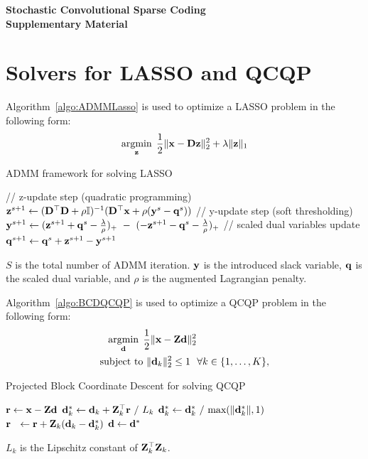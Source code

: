 \begin{strip}
\begin{center}
{\Large \bf Stochastic Convolutional Sparse Coding \\ Supplementary Material }
\end{center}
\end{strip}

\section{Solvers for LASSO and QCQP}
Algorithm~\ref{algo:ADMMLasso} is used to optimize a LASSO problem in the following form:
\begin{equation}
    \minimize{\code} \frac{1}{2}\|\signal - \Filter \code \|_2^2 + \lambda\| \code \|_1
\end{equation}

\begin{algorithm}
\caption{ADMM framework for solving LASSO} \label{algo:ADMMLasso}
\begin{algorithmic}[1]
        \State // z-update step (quadratic programming)
        \State $\code^{s+1} \gets (\Filter ^ \top \Filter + \rho \Id )^{-1}(\Filter^\top \signal + \rho(\Vector{y}^s - \Vector{q}^s ) )$
        \State // y-update step (soft thresholding)
        \State $\Vector{y}^{s+1} \gets (\code^{s+1}+\Vector{q}^{s} - \frac{\lambda}{\rho})_{+} ~ - ~ (-\code^{s+1}-\Vector{q}^{s} - \frac{\lambda}{\rho})_{+}$
        \State // scaled dual variables update
        \State $\Vector{q}^{s+1} \gets \bold{q}^{s}+\code^{s+1}-\Vector{y}^{s+1}$
    \EndFor
\end{algorithmic}
\end{algorithm}
$S$ is the total number of ADMM iteration. $\Vector{y}$ is the introduced slack variable, $\Vector{q}$ is the scaled dual variable, and $\rho$ is the augmented Lagrangian penalty.

Algorithm~\ref{algo:BCDQCQP} is used to optimize a QCQP problem in the following form:
\begin{equation}
\begin{split}
    \minimize{\filter} & \frac{1}{2}\|\signal - \Code \filter \|_2^2 \\
    \text{subject to} & ~ \|\filter_k\|^2_2 \leq 1 ~~ \forall k \in \{1,\dots,K\},
\end{split}
\end{equation}

\begin{algorithm}
\caption{Projected Block Coordinate Descent for solving QCQP} \label{algo:BCDQCQP}
\begin{algorithmic}[1]
\State $\Vector{r} \gets \signal - \Code \filter $
        \State $ \filter^{\ast}_k \gets \filter_k + \Code_k ^ \top \Vector{r} ~ / ~ L_k $
        \State $ \filter^{\ast}_k \gets \filter^{\ast}_k ~ / ~ \text{max}( \|\filter^{\ast}_k\|,1 ) $
        \State $ \Vector{r} ~~ \gets \Vector{r} + \Code_k( \filter_k - \filter^{\ast}_k ) $
    \EndFor
    \State  $ \filter \gets \filter^{\ast} $
\EndWhile
\end{algorithmic}
\end{algorithm}
$L_k$ is the Lipschitz constant of $\Code_k^\top \Code_k$.

